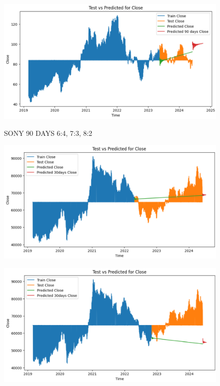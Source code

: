 \documentclass{article}
\begin{document}
\begin{multicols}{2}
\begin{figure}[H]
\begin{minipage}{0.15\textwidth}
    \label{fig:2}
    \end{minipage}%
    \begin{minipage}{0.15\textwidth}
    \centering
    \includegraphics[width=1\textwidth]{Image/VARMA/SONY/8_2/90.png}

    \label{fig:3}
    \end{minipage}
    \caption{SONY 90 DAYS  6:4, 7:3, 8:2 }
\end{figure}

\begin{figure}[H]
    \centering
    \begin{minipage}{0.15\textwidth}
    \centering
    \includegraphics[width=1\textwidth]{Image/VARMA/SAMSUNG/6_4/30.png}
   
    \label{fig:1}
    \end{minipage}%
    \begin{minipage}{0.15\textwidth}
    \centering
    \includegraphics[width=1\textwidth]{Image/VARMA/SAMSUNG/7_3/30.png}
  

\end{minipage}
\end{figure}
\end{multicols}
\end{document}
